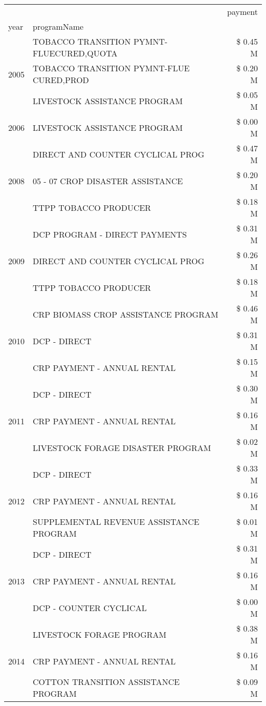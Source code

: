 \begin{tabular}{llr}
\toprule
 &  & payment \\
year & programName &  \\
\midrule
\multirow[t]{3}{*}{2005} & TOBACCO TRANSITION PYMNT-FLUECURED,QUOTA & \$ 0.45 M \\
 & TOBACCO TRANSITION PYMNT-FLUE CURED,PROD & \$ 0.20 M \\
 & LIVESTOCK ASSISTANCE PROGRAM & \$ 0.05 M \\
\cline{1-3}
2006 & LIVESTOCK ASSISTANCE PROGRAM & \$ 0.00 M \\
\cline{1-3}
\multirow[t]{3}{*}{2008} & DIRECT AND COUNTER CYCLICAL PROG & \$ 0.47 M \\
 & 05 - 07 CROP DISASTER ASSISTANCE & \$ 0.20 M \\
 & TTPP TOBACCO PRODUCER & \$ 0.18 M \\
\cline{1-3}
\multirow[t]{3}{*}{2009} & DCP PROGRAM - DIRECT PAYMENTS & \$ 0.31 M \\
 & DIRECT AND COUNTER CYCLICAL PROG & \$ 0.26 M \\
 & TTPP TOBACCO PRODUCER & \$ 0.18 M \\
\cline{1-3}
\multirow[t]{3}{*}{2010} & CRP BIOMASS CROP ASSISTANCE PROGRAM & \$ 0.46 M \\
 & DCP - DIRECT & \$ 0.31 M \\
 & CRP PAYMENT - ANNUAL RENTAL & \$ 0.15 M \\
\cline{1-3}
\multirow[t]{3}{*}{2011} & DCP - DIRECT & \$ 0.30 M \\
 & CRP PAYMENT - ANNUAL RENTAL & \$ 0.16 M \\
 & LIVESTOCK FORAGE DISASTER PROGRAM & \$ 0.02 M \\
\cline{1-3}
\multirow[t]{3}{*}{2012} & DCP - DIRECT & \$ 0.33 M \\
 & CRP PAYMENT - ANNUAL RENTAL & \$ 0.16 M \\
 & SUPPLEMENTAL REVENUE ASSISTANCE PROGRAM & \$ 0.01 M \\
\cline{1-3}
\multirow[t]{3}{*}{2013} & DCP - DIRECT & \$ 0.31 M \\
 & CRP PAYMENT - ANNUAL RENTAL & \$ 0.16 M \\
 & DCP - COUNTER CYCLICAL & \$ 0.00 M \\
\cline{1-3}
\multirow[t]{3}{*}{2014} & LIVESTOCK FORAGE PROGRAM & \$ 0.38 M \\
 & CRP PAYMENT - ANNUAL RENTAL & \$ 0.16 M \\
 & COTTON TRANSITION ASSISTANCE PROGRAM & \$ 0.09 M \\

\end{tabular}
